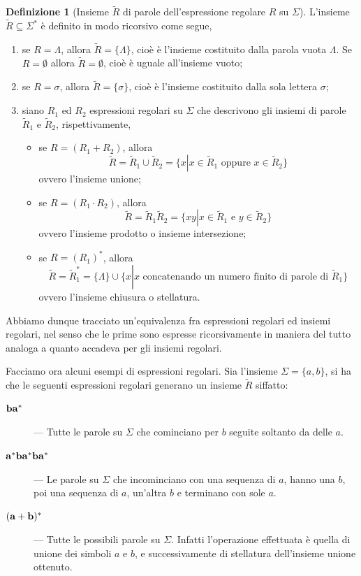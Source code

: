 \documentclass[10pt]{\classname}
\theoremstyle{definition}
\newtheorem{definizione}{Definizione}[section]
\theoremstyle{definition}
\theoremstyle{definition}
\theoremstyle{definition}
\begin{document}
\begin{definizione}[Insieme $\tilde R$ di parole dell'espressione regolare $R$ su $\Sigma$]
L'insieme $\tilde{R}\subseteq \Sigma^*$ è definito in modo ricorsivo come segue,
    \begin{enumerate}
        \item se $R = \Lambda$, allora $\tilde R = \{\Lambda\}$, cioè è l'insieme costituito dalla parola vuota $\Lambda$. Se $R = \emptyset$ allora $\tilde R = \emptyset$, cioè è uguale all'insieme vuoto;
        \item se $R = \sigma$, allora $\tilde R = \{ \sigma \}$, cioè è l'insieme costituito dalla sola lettera $\sigma$;
        \item siano $R_1$ ed $R_2$ espressioni regolari su $\Sigma$ che descrivono gli insiemi di parole $\tilde R_1$ e $\tilde R_2$, rispettivamente,
        \begin{itemize}
        \item se $R = (R_1 + R_2)$, allora \[\tilde R = \tilde R_1 \cup \tilde R_2 = \{x \left|\right. x \in \tilde R_1 \mbox{ oppure } x \in \tilde R_2\}\] ovvero l'insieme unione;
        \item se $R = (R_1 \cdot R_2)$, allora \[\tilde R = \tilde R_1 \tilde R_2 = \{xy \left|\right. x \in \tilde R_1 \mbox{ e } y \in \tilde R_2\}\] ovvero l'insieme prodotto o insieme intersezione;
        \item se $R = (R_1)^*$, allora \[\tilde R = \tilde R_1^* = \{\Lambda\} \cup \{x \left|\right. x \mbox{ concatenando un numero finito di parole di } \tilde R_1\}\] ovvero l'insieme chiusura o stellatura.
        \end{itemize}
    \end{enumerate}
\end{definizione}

Abbiamo dunque tracciato un'equivalenza fra espressioni regolari ed insiemi regolari, nel senso che le prime sono espresse ricorsivamente in maniera del tutto analoga a quanto accadeva per gli insiemi regolari.

Facciamo ora alcuni esempi di espressioni regolari. Sia l'insieme $\Sigma = \{a,b\}$, si ha che le seguenti espressioni regolari generano un insieme $\tilde R$ siffatto:
\begin{description}
    \item[$\bf ba^*$] --- Tutte le parole su $\Sigma$ che cominciano per $b$ seguite
        soltanto da delle $a$.
    \item[$\bf a^*ba^*ba^*$] --- Le parole su $\Sigma$ che incominciano con una sequenza di $a$,
        hanno una $b$, poi una sequenza di $a$, un'altra $b$ e terminano con
        sole $a$.
    \item[$\bf (a+b)^*$] --- Tutte le possibili parole su $\Sigma$. Infatti l'operazione effettuata è quella di unione dei simboli $a$ e $b$, e successivamente di stellatura dell'insieme unione ottenuto.
\end{description}
\end{document}

